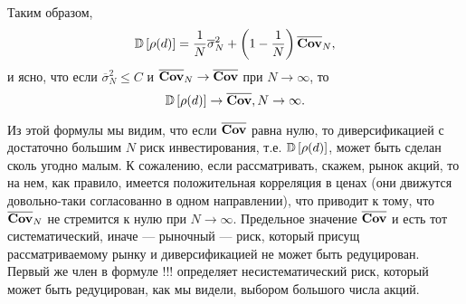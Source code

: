 Таким образом,
\[
\mathbb{D}\left[\rho(d)\right] = \frac{1}{N} \overline{\sigma}_N^2 + \left(1 - \frac{1}{N}\right) \overline{\textbf{Cov}}_N ,
\]
и ясно, что если $\overline{\sigma}_N^2 \le C$ и $\overline{\textbf{Cov}}_N \rightarrow \overline{\textbf{Cov}}$ при $N \rightarrow \infty$, то
\[
\mathbb{D}\left[\rho(d)\right] \rightarrow \overline{\textbf{Cov}}, N \rightarrow \infty .
\]

Из этой формулы мы видим, что если $\overline{\textbf{Cov}}$ равна нулю, то диверсификацией с достаточно большим $N$ риск инвестирования,
т.е. $\mathbb{D}\left[\rho(d)\right]$, может быть сделан сколь угодно малым. К сожалению, если рассматривать, скажем, рынок акций, то на нем, как правило,
имеется положительная корреляция в ценах (они движутся довольно-таки согласованно в одном направлении), что приводит к тому, что
$\overline{\textbf{Cov}}_N$ не стремится к нулю при $N \rightarrow \infty$. Предельное значение $\overline{\textbf{Cov}}$ и есть тот систематический,
иначе --- рыночный --- риск, который присущ рассматриваемому рынку и диверсификацией не может быть редуцирован. Первый же член в формуле
!!! определяет несистематический риск, который может быть редуцирован, как мы видели, выбором большого числа акций.